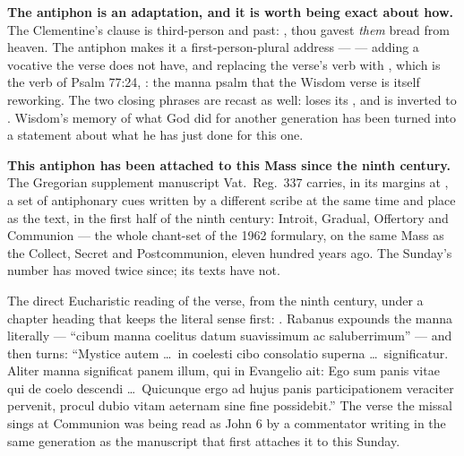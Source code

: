 \textbf{The antiphon is an adaptation, and it is worth being exact about how.}
The Clementine's clause is third-person and past: , thou gavest \textit{them} bread from heaven.
The antiphon makes it a first-person-plural address ---  --- adding a vocative the verse does not have, and replacing the verse's
verb  with , which is the verb of Psalm 77:24,
: the manna psalm that the Wisdom verse is itself
reworking. The two closing phrases are recast as well:  loses its , and  is inverted to . Wisdom's memory
of what God did for another generation has been turned into a statement about
what he has just done for this one.

\textbf{This antiphon has been attached to this Mass since the ninth century.}
The Gregorian supplement manuscript Vat.\ Reg.\ 337 carries, in its margins at
, a set of antiphonary cues written by a
different scribe at the same time and place as the text, in the first half of
the ninth century:  Introit, Gradual,
Offertory and Communion --- the whole chant-set of the 1962 formulary, on the
same Mass as the Collect, Secret and Postcommunion, eleven hundred years ago.
The Sunday's number has moved twice since; its texts have not.

\begin{witnessnote}
The direct Eucharistic reading of the verse, from the ninth century, under a
chapter heading that keeps the literal sense first: . Rabanus expounds the
manna literally --- ``cibum manna coelitus datum suavissimum ac saluberrimum''
--- and then turns: ``Mystice autem \dots\ in coelesti cibo consolatio superna
\dots\ significatur. Aliter manna significat panem illum, qui in Evangelio ait:
Ego sum panis vitae qui de coelo descendi \dots\ Quicunque ergo ad hujus panis
participationem veraciter pervenit, procul dubio vitam aeternam sine fine
possidebit.'' The verse the missal sings at Communion was being read as John 6
by a commentator writing in the same generation as the manuscript that first
attaches it to this Sunday.
\end{witnessnote}

